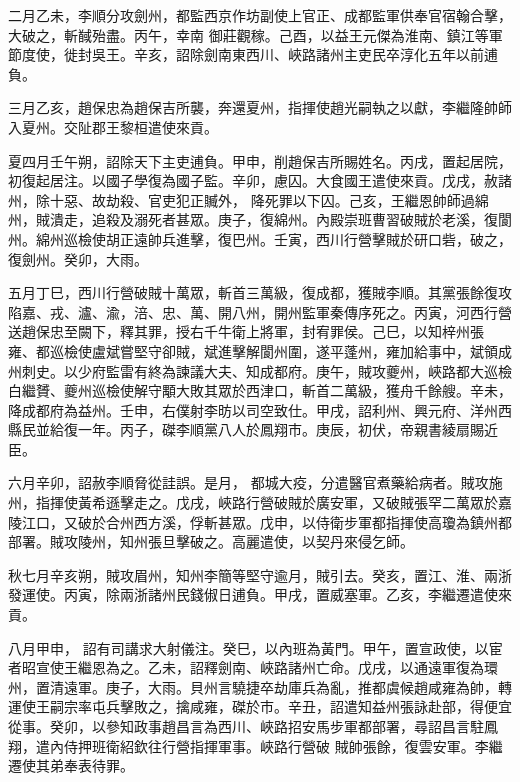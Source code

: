 \begin{pinyinscope}
 二月乙未，李順分攻劍州，都監西京作坊副使上官正、成都監軍供奉官宿翰合擊，大破之，斬馘殆盡。丙午，幸南
 御莊觀稼。己酉，以益王元傑為淮南、鎮江等軍節度使，徙封吳王。辛亥，詔除劍南東西川、峽路諸州主吏民卒淳化五年以前逋負。



 三月乙亥，趙保忠為趙保吉所襲，奔還夏州，指揮使趙光嗣執之以獻，李繼隆帥師入夏州。交阯郡王黎桓遣使來貢。



 夏四月壬午朔，詔除天下主吏逋負。甲申，削趙保吉所賜姓名。丙戌，置起居院，初復起居注。以國子學復為國子監。辛卯，慮囚。大食國王遣使來貢。戊戌，赦諸州，除十惡、故劫殺、官吏犯正贓外，
 降死罪以下囚。己亥，王繼恩帥師過綿州，賊潰走，追殺及溺死者甚眾。庚子，復綿州。內殿崇班曹習破賊於老溪，復閬州。綿州巡檢使胡正遠帥兵進擊，復巴州。壬寅，西川行營擊賊於研口砦，破之，復劍州。癸卯，大雨。



 五月丁巳，西川行營破賊十萬眾，斬首三萬級，復成都，獲賊李順。其黨張餘復攻陷嘉、戎、瀘、渝，涪、忠、萬、開八州，開州監軍秦傳序死之。丙寅，河西行營送趙保忠至闕下，釋其罪，授右千牛衛上將軍，封宥罪侯。己巳，以知梓州張
 雍、都巡檢使盧斌嘗堅守卻賊，斌進擊解閬州圍，遂平蓬州，雍加給事中，斌領成州刺史。以少府監雷有終為諫議大夫、知成都府。庚午，賊攻夔州，峽路都大巡檢白繼贇、夔州巡檢使解守顒大敗其眾於西津口，斬首二萬級，獲舟千餘艘。辛未，降成都府為益州。壬申，右僕射李昉以司空致仕。甲戌，詔利州、興元府、洋州西縣民並給復一年。丙子，磔李順黨八人於鳳翔市。庚辰，初伏，帝親書綾扇賜近臣。



 六月辛卯，詔赦李順脅從詿誤。是月，
 都城大疫，分遣醫官煮藥給病者。賊攻施州，指揮使黃希遜擊走之。戊戌，峽路行營破賊於廣安軍，又破賊張罕二萬眾於嘉陵江口，又破於合州西方溪，俘斬甚眾。戊申，以侍衛步軍都指揮使高瓊為鎮州都部署。賊攻陵州，知州張旦擊破之。高麗遣使，以契丹來侵乞師。



 秋七月辛亥朔，賊攻眉州，知州李簡等堅守逾月，賊引去。癸亥，置江、淮、兩浙發運使。丙寅，除兩浙諸州民錢俶日逋負。甲戌，置威塞軍。乙亥，李繼遷遣使來貢。



 八月甲申，
 詔有司講求大射儀注。癸巳，以內班為黃門。甲午，置宣政使，以宦者昭宣使王繼恩為之。乙未，詔釋劍南、峽路諸州亡命。戊戌，以通遠軍復為環州，置清遠軍。庚子，大雨。貝州言驍捷卒劫庫兵為亂，推都虞候趙咸雍為帥，轉運使王嗣宗率屯兵擊敗之，擒咸雍，磔於市。辛丑，詔遣知益州張詠赴部，得便宜從事。癸卯，以參知政事趙昌言為西川、峽路招安馬步軍都部署，尋詔昌言駐鳳翔，遣內侍押班衛紹欽往行營指揮軍事。峽路行營破
 賊帥張餘，復雲安軍。李繼遷使其弟奉表待罪。




\end{pinyinscope}
